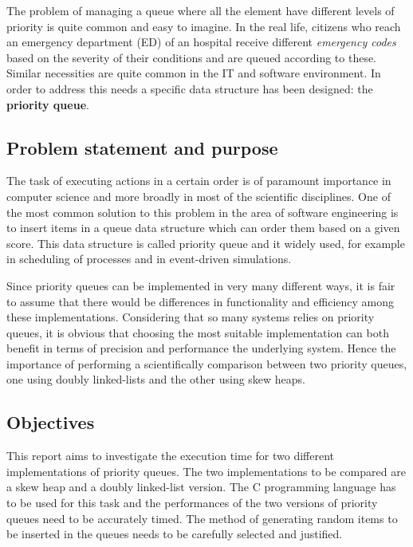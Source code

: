 \documentclass{article}
\begin{document}
The problem of managing a queue where all the element have different levels of priority is quite common and easy to imagine. In the real life, citizens who reach an emergency department (ED) of an hospital receive different \textit{emergency codes} based on the severity of their conditions and are queued according to these. Similar necessities are quite common in the IT and software environment. In order to address this needs a specific data structure has been designed: the \textbf{priority queue}.

\pagebreak



\subsection{Problem statement and purpose}
The task of executing actions in a certain order is of paramount importance in computer science and more broadly in most of the scientific disciplines. One of the most common solution to this problem in the area of software engineering is to insert items in a queue data structure which can order them based on a given score. This data structure is called priority queue and it widely used, for example in scheduling of processes and in event-driven simulations.

Since priority queues can be implemented in very many different ways, it is fair to assume that there would be differences in functionality and efficiency among these implementations. Considering that so many systems relies on priority queues, it is obvious that choosing the most suitable implementation can both benefit in terms of precision and performance the underlying system. Hence the importance of performing a scientifically comparison between two priority queues, one using doubly linked-lists and the other using skew heaps.

\pagebreak



\subsection{Objectives}
This report aims to investigate the execution time for two different implementations of priority queues. The two implementations to be compared are a skew heap and a doubly linked-list version. The C programming language has to be used for this task and the performances of the two versions of priority queues need to be accurately timed. The method of generating random items to be inserted in the queues needs to be carefully selected and justified.
\end{document}
